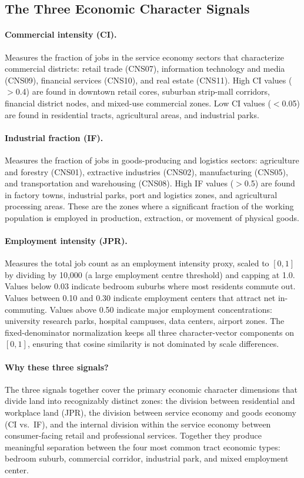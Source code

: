 \subsection{The Three Economic Character Signals}

\paragraph{Commercial intensity (CI).}
Measures the fraction of jobs in the service economy sectors that characterize
commercial districts: retail trade (CNS07), information technology and media
(CNS09), financial services (CNS10), and real estate (CNS11).
High CI values ($>$0.4) are found in downtown retail cores, suburban
strip-mall corridors, financial district nodes, and mixed-use commercial zones.
Low CI values ($<$0.05) are found in residential tracts, agricultural areas,
and industrial parks.

\paragraph{Industrial fraction (IF).}
Measures the fraction of jobs in goods-producing and logistics sectors:
agriculture and forestry (CNS01), extractive industries (CNS02),
manufacturing (CNS05), and transportation and warehousing (CNS08).
High IF values ($>$0.5) are found in factory towns, industrial parks,
port and logistics zones, and agricultural processing areas.
These are the zones where a significant fraction of the working population is
employed in production, extraction, or movement of physical goods.

\paragraph{Employment intensity (JPR).}
Measures the total job count as an employment intensity proxy, scaled to $[0,1]$
by dividing by 10,000 (a large employment centre threshold) and capping at 1.0.
Values below 0.03 indicate bedroom suburbs where most residents commute out.
Values between 0.10 and 0.30 indicate employment centers that attract net
in-commuting.
Values above 0.50 indicate major employment concentrations: university research
parks, hospital campuses, data centers, airport zones.
The fixed-denominator normalization keeps all three character-vector components
on $[0,1]$, ensuring that cosine similarity is not dominated by scale differences.

\paragraph{Why these three signals?}
The three signals together cover the primary economic character dimensions
that divide land into recognizably distinct zones:
the division between residential and workplace land (JPR),
the division between service economy and goods economy (CI vs.\ IF),
and the internal division within the service economy between
consumer-facing retail and professional services.
Together they produce meaningful separation between the four most common
tract economic types: bedroom suburb, commercial corridor, industrial park,
and mixed employment center.


